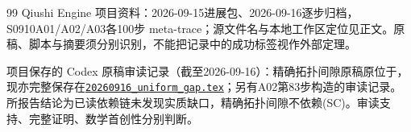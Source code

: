 \documentclass[UTF8,a4paper,11pt,fontset=fandol]{ctexart}
\numberwithin{equation}{section}
\theoremstyle{definition}
\begin{document}
\begin{thebibliography}{99}
 Qiushi Engine 项目资料：2026-09-15进展包、2026-09-16逐步归档，S0910A01/A02/A03各100步 meta-trace；源文件名与本地工作区定位见正文。原稿、脚本与摘要须分别识别，不能把记录中的成功标签视作外部定理。

 项目保存的 Codex 原稿审读记录（截至2026-09-16）：精确拓扑间隙原稿原位于，现亦完整保存在\href{20260916_uniform_gap.tex}{\texttt{20260916\_uniform\_gap.tex}}；另有A02第83步构造的审读记录。所报告结论为已读依赖链未发现实质缺口，精确拓扑间隙不依赖(SC)。审读支持、完整证明、数学首创性分别判断。

\end{thebibliography}
\end{document}
